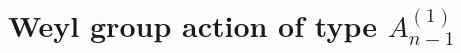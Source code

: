 \documentclass[12pt,twoside]{article}
\theoremstyle{plain} %
\theoremstyle{definition} %
\theoremstyle{definition} %
\numberwithin{theorem}{section}
\numberwithin{equation}{section}
\numberwithin{figure}{section}
\numberwithin{table}{section}
\begin{document}
\section{Weyl group action of type $A^{(1)}_{n-1}$}
\label{sec:A^{(1)}_{n-1}}

%
%
%
%
%
%
%
%
\end{document}
